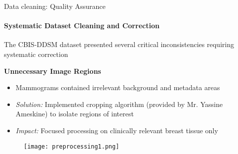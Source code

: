 \begin{frame}
\begin{columns}[T]
\begin{column}{0.45\textwidth}

\end{column}
\end{columns}

\end{frame}


\begin{frame}{Data cleaning: Quality Assurance}
    \framesubtitle{Systematic Dataset Cleaning and Correction}
    
    The CBIS-DDSM dataset presented several critical inconsistencies requiring systematic correction
    
    \vspace{0.2cm}
    
     \textbf{Unnecessary Image Regions}
            \begin{itemize}
                \item Mammograms contained irrelevant background and metadata areas
                \item \textit{Solution:} Implemented cropping algorithm (provided by Mr. Yassine Ameskine) to isolate regions of interest
                \item \textit{Impact:} Focused processing on clinically relevant breast tissue only
            \end{itemize}
       \begin{figure}
                \centering
                \texttt{[image: preprocessing1.png]}
        \end{figure}     
\end{frame}

